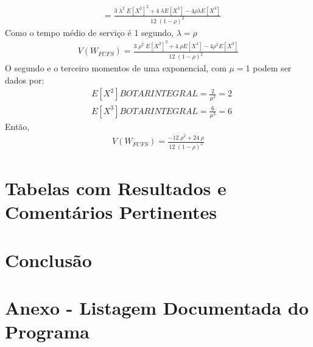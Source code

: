 \documentclass[a4paper]{article}
\begin{document}
\begin{itemize}
\begin{align*}
        &= \frac{3\;\lambda^2\;E[X^2]^2 + 4\;\lambda E[X^3]- 4\rho\lambda E[X^3]}{12\;(1-\rho)^2}
    \end{align*}
    Como o tempo médio de serviço é 1 segundo, \(\lambda = \rho\)
    \begin{align*}
        V(W_{FCFS}) = \frac{3\;\rho^2\;E[X^2]^2 + 4\;\rho E[X^3]- 4\rho^2 E[X^3]}{12\;(1-\rho)^2}
    \end{align*}
    O segundo e o terceiro momentos de uma exponencial, com \(\mu = 1\) podem ser dados por:
    \begin{align*}
       &E[X^2] BOTAR INTEGRAL = \frac{2}{\mu^2 } = 2 \\
       &E[X^3] BOTAR INTEGRAL = \frac{6}{\mu^3 } = 6
    \end{align*}
    Então,
    \begin{align*}
        V(W_{FCFS}) = \frac{-12\;\rho^2+ 24\;\rho }{12\;(1-\rho)^2}
    \end{align*}
\end{itemize}
\section{Tabelas com Resultados e Comentários Pertinentes}
\section{Conclusão}
\section{Anexo - Listagem Documentada do Programa}
\end{document}
